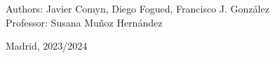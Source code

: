 \begin{titlepage}
\vspace*{3cm}
\noindent
\large{Authors: Javier Comyn, Diego Fogued, Francisco J. González}\\
\large{Professor: Susana Muñoz Hernández}

\vspace*{2cm}
\begin{center}
Madrid, 2023/2024
\end{center}
\end{titlepage}

